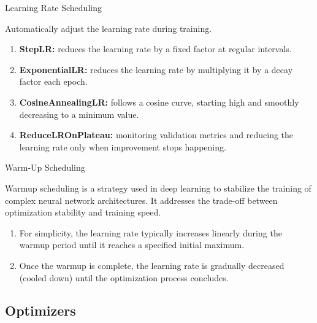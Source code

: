\documentclass[aspectratio=169,xcolor=dvipsnames,svgnames,x11names,fleqn]{beamer}
\begin{document}
\begin{frame}{Learning Rate Scheduling}

\begin{block}{}

Automatically adjust the learning rate during training.

\end{block}

\begin{enumerate}
\item \textbf{StepLR:} reduces the learning rate by a fixed factor at regular intervals.
\item \textbf{ExponentialLR:} reduces the learning rate by multiplying it by a decay factor each epoch.

\item \textbf{CosineAnnealingLR:} follows a cosine curve, starting high and smoothly decreasing to a minimum value.

\item \textbf{ReduceLROnPlateau:}  monitoring validation metrics and reducing the learning rate only when improvement stops happening.
\end{enumerate}

\end{frame}

\begin{frame}{Warm-Up Scheduling}

\begin{block}{}

Warmup scheduling is a strategy used in deep learning to stabilize the training of complex neural network architectures. It addresses the trade-off between optimization stability and training speed.

\end{block}

\begin{enumerate}
\item For simplicity, the learning rate typically increases linearly during the warmup period until it reaches a specified initial maximum.

\item Once the warmup is complete, the learning rate is gradually decreased (cooled down) until the optimization process concludes.
\end{enumerate}

\end{frame}


\subsection{Optimizers}
\end{document}
